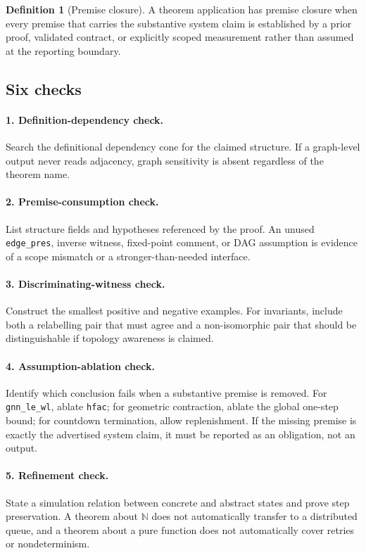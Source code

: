 \documentclass[10pt,letterpaper]{article}
\theoremstyle{definition}
\newtheorem{definition}[theorem]{Definition}
\begin{document}
\begin{definition}[Premise closure]
A theorem application has premise closure when every premise that carries the
substantive system claim is established by a prior proof, validated contract,
or explicitly scoped measurement rather than assumed at the reporting
boundary.
\end{definition}

\subsection{Six checks}
\paragraph{1. Definition-dependency check.}
Search the definitional dependency cone for the claimed structure. If a
graph-level output never reads adjacency, graph sensitivity is absent
regardless of the theorem name.

\paragraph{2. Premise-consumption check.}
List structure fields and hypotheses referenced by the proof. An unused
\texttt{edge\_pres}, inverse witness, fixed-point comment, or DAG assumption is
evidence of a scope mismatch or a stronger-than-needed interface.

\paragraph{3. Discriminating-witness check.}
Construct the smallest positive and negative examples. For invariants, include
both a relabelling pair that must agree and a non-isomorphic pair that should be
distinguishable if topology awareness is claimed.

\paragraph{4. Assumption-ablation check.}
Identify which conclusion fails when a substantive premise is removed. For
\texttt{gnn\_le\_wl}, ablate \texttt{hfac}; for geometric contraction, ablate
the global one-step bound; for countdown termination, allow replenishment.
If the missing premise is exactly the advertised system claim, it must be
reported as an obligation, not an output.

\paragraph{5. Refinement check.}
State a simulation relation between concrete and abstract states and prove step
preservation. A theorem about \(\mathbb{N}\) does not automatically transfer to
a distributed queue, and a theorem about a pure function does not automatically
cover retries or nondeterminism.
\end{document}
